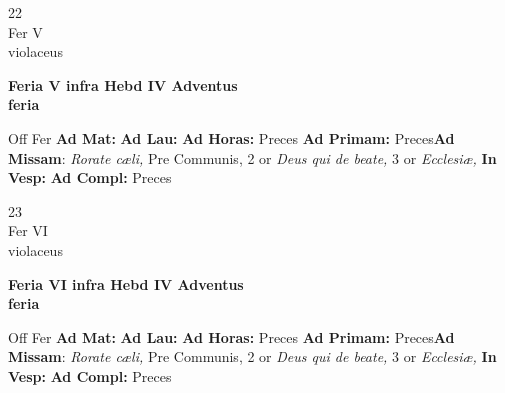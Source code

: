\documentclass[10pt, openany]{book}
\begin{document}
    \begin{center}
        \begin{minipage}{3.5in}
            \vspace{2em}
            \begin{minipage}{0.5in}
                {\Huge 22} \\
                {\normalsize Fer V} \\
                {\normalsize violaceus}
            \end{minipage}
            \begin{minipage}{3.0in}
                \textbf{ \large Feria V infra Hebd IV Adventus \\
                \textnormal{\normalsize feria}} \\ 
            \end{minipage}
            \begin{justify}Off Fer
                \textbf{Ad Mat: }
                \textbf{Ad Lau: }
                \textbf{Ad Horas: }Preces
                \textbf{Ad Primam: }Preces\textbf{Ad Missam}: \textit{Rorate cæli,} Pre Communis, 2 or \textit{Deus qui de beate,} 3 or \textit{Ecclesiæ,}  
                \textbf{In Vesp: }
                \textbf{Ad Compl: }Preces
            \end{justify}
        \end{minipage}
    \end{center}

    \begin{center}
        \begin{minipage}{3.5in}
            \vspace{2em}
            \begin{minipage}{0.5in}
                {\Huge 23} \\
                {\normalsize Fer VI} \\
                {\normalsize violaceus}
            \end{minipage}
            \begin{minipage}{3.0in}
                \textbf{ \large Feria VI infra Hebd IV Adventus \\
                \textnormal{\normalsize feria}} \\ 
            \end{minipage}
            \begin{justify}Off Fer
                \textbf{Ad Mat: }
                \textbf{Ad Lau: }
                \textbf{Ad Horas: }Preces
                \textbf{Ad Primam: }Preces\textbf{Ad Missam}: \textit{Rorate cæli,} Pre Communis, 2 or \textit{Deus qui de beate,} 3 or \textit{Ecclesiæ,}  
                \textbf{In Vesp: }
                \textbf{Ad Compl: }Preces
            \end{justify}
        \end{minipage}
    \end{center}
\end{document}
